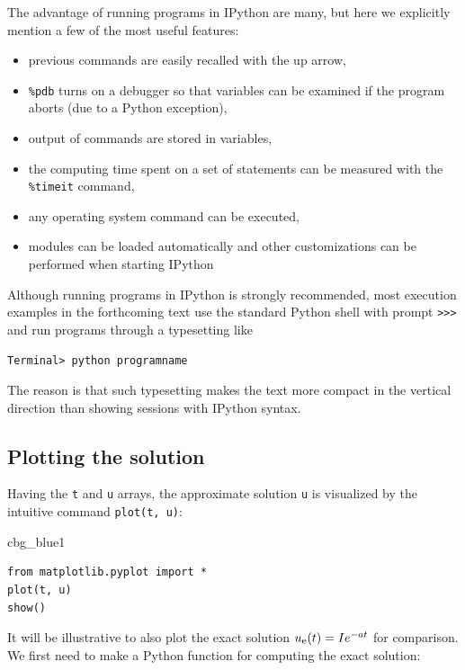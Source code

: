 \documentclass[%
oneside,                 %
final,                   %
10pt]{article}
\newenvironment{_cod_tight}[1]{
   \def\FrameCommand{\colorbox{#1}}
   \FrameRule0.6pt\MakeFramed {\FrameRestore}\vskip3mm}
   {\vskip0mm\endMakeFramed}
\newenvironment{cod}[1]{
\bgroup\rmfamily
\fboxsep=0mm\relax
\begin{_cod_tight}{#1}
\list{}{\parsep=-2mm\parskip=0mm\topsep=0pt\leftmargin=2mm
\rightmargin=2\leftmargin\leftmargin=4pt\relax}
\item\relax}
{\endlist\end{_cod_tight}\egroup}
\begin{document}
The advantage of running programs in IPython are many, but here
we explicitly mention a few of the most
useful features:

\begin{itemize}
 \item previous commands are easily recalled with the up arrow,

 \item \Verb!%pdb! turns on a debugger so that variables can be examined if the program
   aborts (due to a Python exception),

 \item output of commands are stored in variables,

 \item the computing time spent on a set of statements can be measured with
   the \Verb!%timeit! command,

 \item any operating system command can be executed,

 \item modules can be loaded automatically and other customizations can
   be performed when starting IPython
\end{itemize}

\noindent
Although running programs in IPython is strongly recommended, most
execution examples in the forthcoming text use the standard
Python shell with prompt \texttt{>>>} and run programs through
a typesetting like

\begin{Verbatim}[frame=lines,label=\fbox{{\tiny Terminal}},framesep=2.5mm,framerule=0.7pt,fontsize=\fontsize{9pt}{9pt}]
Terminal> python programname
\end{Verbatim}
The reason is that such typesetting
makes the text more compact in the vertical direction
than showing sessions with IPython syntax.

\label{decay:plotting}

\subsection{Plotting the solution}

Having the \texttt{t} and \texttt{u} arrays, the approximate solution \texttt{u} is visualized
by the intuitive command \texttt{plot(t, u)}:

\begin{cod}{cbg_blue1}\begin{Verbatim}[numbers=none,fontsize=\fontsize{9pt}{9pt},baselinestretch=0.95,xleftmargin=2mm]
from matplotlib.pyplot import *
plot(t, u)
show()
\end{Verbatim}
\end{cod}
\noindent
It will be illustrative to also plot the exact solution
$\uex(t)=Ie^{-at}$ for comparison. We first
need to make a Python function for computing the exact solution:
\end{document}
